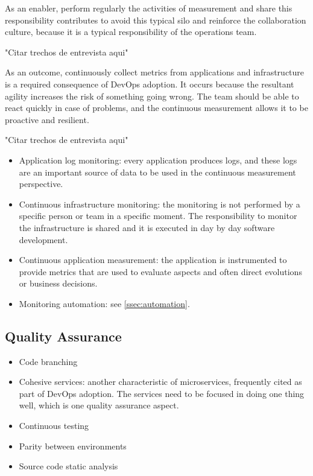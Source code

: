 As an enabler, perform regularly the activities of measurement and share this responsibility contributes to avoid this typical silo and reinforce the collaboration culture, because it is a typical responsibility of the operations team.

"Citar trechos de entrevista aqui"

As an outcome, continuously collect metrics from applications and infrastructure is a required consequence of DevOps adoption. It occurs because the resultant agility increases the risk of something going wrong. The team should be able to react quickly in case of problems, and the continuous measurement allows it to be proactive and resilient.

"Citar trechos de entrevista aqui"

\begin{itemize}
\item Application log monitoring: every application produces logs, and these logs are an important source of data to be used in the continuous measurement perspective.

\item Continuous infrastructure monitoring: the monitoring is not performed by a specific person or team in a specific moment. The responsibility to monitor the infrastructure is shared and it is executed in day by day software development.

\item Continuous application measurement: the application is instrumented to provide metrics that are used to evaluate aspects and often direct evolutions or business decisions.

\item Monitoring automation: see \ref{ssec:automation}.
\end{itemize}

\subsection{Quality Assurance}
\begin{itemize}
\item Code branching

\item Cohesive services: another characteristic of microservices, frequently cited as part of DevOps adoption. The services need to be focused in doing one thing well, which is one quality assurance aspect.

\item Continuous testing
\item Parity between environments
\item Source code static analysis
\end{itemize}

